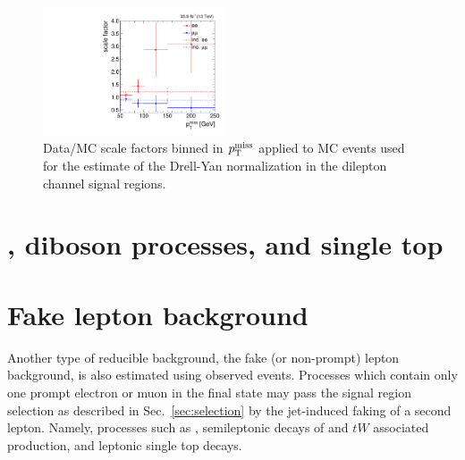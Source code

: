 \begin{figure}
  \centering
  \includegraphics[width=0.48\textwidth]{figs/metbinned_Rinout_SFs.pdf}       
  \caption{Data/MC scale factors binned in ${ p_{\text{T}}^{\text{miss}}}$ applied to MC events used for the estimate of the Drell-Yan normalization in the dilepton channel signal regions.}
  \label{fig:RinoutSFs}
\end{figure}

\section{\ttV, diboson processes, and single top}

\section{Fake lepton background}

Another type of reducible background, the fake (or non-prompt) lepton background, is also estimated using observed events. Processes which contain only one prompt electron or muon in the final state may pass the signal region selection as described in Sec.~\ref{sec:selection} by the jet-induced faking of a second lepton. Namely, processes such as \Wjets, semileptonic decays of \ttbar and $tW$ associated production, and leptonic single top decays.     

